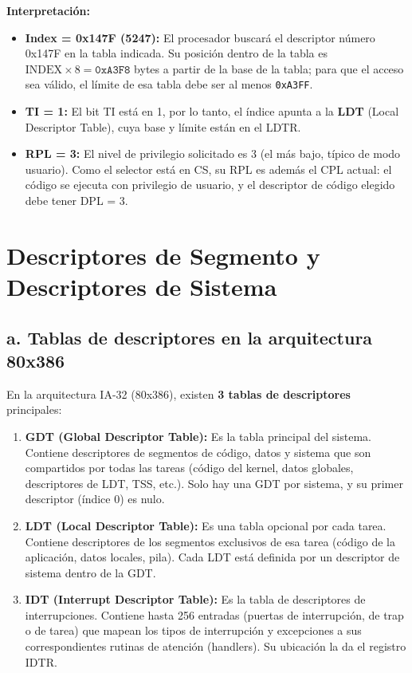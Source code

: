 \documentclass[RT]{UTNLSE}
\begin{document}
\textbf{Interpretación:}
\begin{itemize}
    \item \textbf{Index = 0x147F (5247):} El procesador buscará el descriptor número 0x147F en la tabla indicada. Su posición dentro de la tabla es \(\mathrm{INDEX}\times 8 = \texttt{0xA3F8}\) bytes a partir de la base de la tabla; para que el acceso sea válido, el límite de esa tabla debe ser al menos \texttt{0xA3FF}.
    \item \textbf{TI = 1:} El bit TI está en 1, por lo tanto, el índice apunta a la \textbf{LDT} (Local Descriptor Table), cuya base y límite están en el LDTR.
    \item \textbf{RPL = 3:} El nivel de privilegio solicitado es 3 (el más bajo, típico de modo usuario). Como el selector está en CS, su RPL es además el CPL actual: el código se ejecuta con privilegio de usuario, y el descriptor de código elegido debe tener DPL = 3.
\end{itemize}

\section{Descriptores de Segmento y Descriptores de Sistema}

\subsection*{a. Tablas de descriptores en la arquitectura 80x386}
En la arquitectura IA-32 (80x386), existen \textbf{3 tablas de descriptores} principales:

\begin{enumerate}
    \item \textbf{GDT (Global Descriptor Table):} Es la tabla principal del sistema. Contiene descriptores de segmentos de código, datos y sistema que son compartidos por todas las tareas (código del kernel, datos globales, descriptores de LDT, TSS, etc.). Solo hay una GDT por sistema, y su primer descriptor (índice 0) es nulo.
    \item \textbf{LDT (Local Descriptor Table):} Es una tabla opcional por cada tarea. Contiene descriptores de los segmentos exclusivos de esa tarea (código de la aplicación, datos locales, pila). Cada LDT está definida por un descriptor de sistema dentro de la GDT.
    \item \textbf{IDT (Interrupt Descriptor Table):} Es la tabla de descriptores de interrupciones. Contiene hasta 256 entradas (puertas de interrupción, de trap o de tarea) que mapean los tipos de interrupción y excepciones a sus correspondientes rutinas de atención (handlers). Su ubicación la da el registro IDTR.
\end{enumerate}
\end{document}
